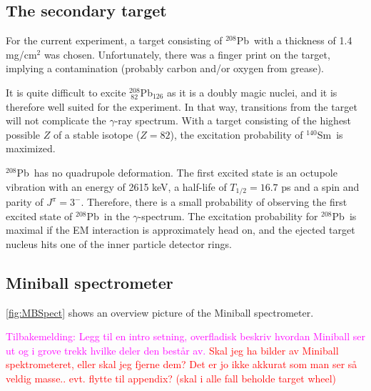 \documentclass[twoside,english]{uiofysmaster/uiofysmaster}
\newcommand{\Sm}{$^{140}$Sm} %
\newcommand{\Pb}{$^{208}$Pb}
\newcommand{\ga}{$\gamma$}
\let\orgautoref\autoref
\renewcommand{\autoref}
        {%
		 \def\sectionautorefname{Section}%
		 \def\subsectionautorefname{Section}%
		 \def\subsubsectionautorefname{Section}%
		 \def\chapterautorefname{Chapter}%
          \orgautoref}
\begin{document}

\subsection{The secondary target}\label{ssec:Pb}
For the current experiment, a target consisting of \Pb\ with a thickness of 1.4 mg/cm$^2$ was chosen. 
Unfortunately, there was a finger print on the target, implying a contamination (probably carbon and/or oxygen from grease).

It is quite difficult to excite $^{208}_{~82}$Pb$_{126}$ as it is a doubly magic nuclei, and it is therefore well suited for the experiment. 
In that way, transitions from the target will not complicate the \ga-ray spectrum.
With a target consisting of the highest possible $Z$ of a stable isotope ($Z = 82$), the excitation probability of \Sm\ is maximized. 

\Pb\ has no quadrupole deformation.
The first excited state is an octupole vibration with an energy of 2615 keV, a half-life of $T_{1/2} = 16.7$ ps and a spin and parity of $J^\pi = 3^-$.
Therefore, there is a small probability of observing the first excited state of \Pb\ in the \ga-spectrum. 
The excitation probability for \Pb\ is maximal if the EM interaction is approximately head on, and the ejected target nucleus hits one of the inner particle detector rings.


\subsection{Miniball spectrometer}
\autoref{fig:MBSpect} shows an overview picture of the Miniball spectrometer. 

\textcolor{Magenta}{Tilbakemelding:\newline
Legg til en intro setning, overfladisk beskriv hvordan Miniball ser ut og i grove trekk hvilke deler den består av.
}
\textcolor{red}{Skal jeg ha bilder av Miniball spektrometeret, eller skal jeg fjerne dem? Det er jo ikke akkurat som man ser så veldig masse.. evt. flytte til appendix? (skal i alle fall beholde target wheel)}
\end{document}
